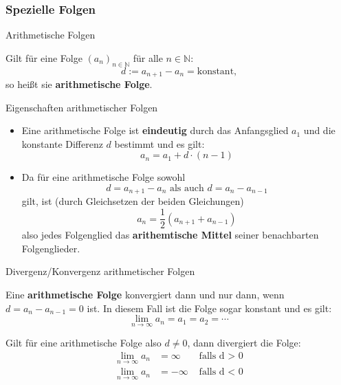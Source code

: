 \subsubsection{Spezielle Folgen}

\begin{frame}{Arithmetische Folgen}
	\begin{definition}
		Gilt für eine Folge $\left(a_{n}\right)_{n \in \mathbb{N}}$ für alle $n \in \mathbb{N}$:
		\[
		d := a_{n+1} - a_{n} = \mbox{konstant,}
		\]
		so heißt sie \textbf{arithmetische Folge}.
	\end{definition}
\end{frame}	
\begin{frame}{Eigenschaften arithmetischer Folgen}
	\begin{bemerkung}
		\begin{itemize}
		\item Eine arithmetische Folge ist \textbf{eindeutig} durch das Anfangsglied $a_{1}$ und die konstante Differenz $d$ bestimmt und es gilt:
		\[
			a_{n} = a_{1} + d \cdot (n - 1)
		\]
		\item Da für eine arithmetische Folge sowohl
		\[
			d = a_{n+1} - a_{n} \mbox{ als auch } d = a_{n} - a_{n-1}
		\] 
		gilt, ist (durch Gleichsetzen der beiden Gleichungen)
		\[
			a_{n} = \frac{1}{2} \left( a_{n+1} + a_{n-1}\right)
		\]
		also jedes Folgenglied das \textbf{arithemtische Mittel} seiner benachbarten Folgenglieder.
		\end{itemize}	
	\end{bemerkung}
\end{frame}

\begin{frame}{Divergenz/Konvergenz arithmetischer Folgen}
	\begin{theorem}
		Eine \textbf{arithmetische Folge} konvergiert dann und nur dann, wenn $d = a_{n} - a_{n-1} = 0$ ist. In diesem Fall ist die Folge sogar konstant und es gilt:
		\[
		\lim_{n \to \infty} a_{n} = a_{1} = a_{2} = \cdots
		\] 
		
		Gilt für eine arithmetische Folge also $d \neq 0$, dann divergiert die Folge:
		\begin{align*}
			\lim_{n \to \infty} a_{n} & = \infty & \mbox{ falls d > 0} \\
			\lim_{n \to \infty} a_{n} & = - \infty & \mbox{ falls d < 0}
		\end{align*}
	\end{theorem}
\end{frame}

